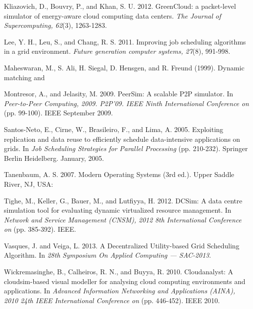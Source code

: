 \documentclass[times, 10pt,twocolumn]{article}
\begin{document}
\begin{thebibliography}{1}
 Kliazovich, D., Bouvry, P., and Khan, S. U. 2012. GreenCloud: a packet-level simulator of energy-aware cloud computing data centers. {\em The Journal of Supercomputing, 62}(3), 1263-1283.

 Lee, Y. H., Leu, S., and Chang, R. S. 2011. Improving job scheduling algorithms in a grid environment. {\em Future generation computer systems, 27}(8), 991-998.

Maheswaran, M., S. Ali, H. Siegal, D. Hensgen, and R. Freund (1999). Dynamic matching and

 Montresor, A., and Jelasity, M. 2009. PeerSim: A scalable P2P simulator. In {\em Peer-to-Peer Computing, 2009. P2P'09. IEEE Ninth International Conference on} (pp. 99-100). IEEE September 2009.

 Santos-Neto, E., Cirne, W., Brasileiro, F., and Lima, A. 2005. Exploiting replication and data reuse to efficiently schedule data-intensive applications on grids. In {\em Job Scheduling Strategies for Parallel Processing} (pp. 210-232). Springer Berlin Heidelberg. January, 2005.

 Tanenbaum, A. S. 2007. Modern Operating Systems (3rd ed.). Upper Saddle River, NJ, USA:

 Tighe, M., Keller, G., Bauer, M., and Lutfiyya, H. 2012. DCSim: A data centre simulation tool for evaluating dynamic virtualized resource management. In {\em Network and Service Management (CNSM), 2012 8th International Conference on} (pp. 385-392). IEEE.

 Vasques, J. and Veiga, L. 2013. A Decentralized Utility-based Grid Scheduling Algorithm. In {\em 28th Symposium On Applied Computing --- SAC-2013}.

 Wickremasinghe, B., Calheiros, R. N., and Buyya, R. 2010. Cloudanalyst: A cloudsim-based visual modeller for analysing cloud computing environments and applications. In {\em Advanced Information Networking and Applications (AINA), 2010 24th IEEE International Conference on} (pp. 446-452). IEEE 2010.


\end{thebibliography}
\end{document}
